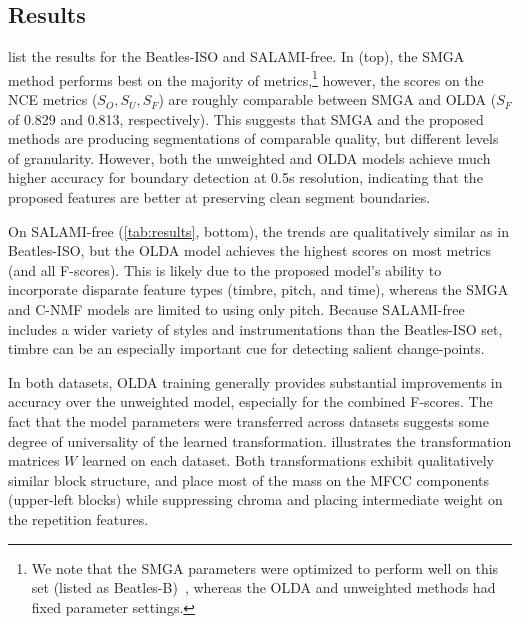\documentclass{article}
\begin{document}
\subsection{Results}
\label{sec:results}
 list the results for the Beatles-ISO and SALAMI-free.
In  (top), the SMGA method performs best on the majority of metrics,\footnote{We
note that the SMGA parameters were optimized to perform well on this set (listed as
Beatles-B)~\cite{serra2012unsupervised}, whereas the OLDA and unweighted methods had fixed parameter settings.}
however, the scores on the NCE metrics ($S_O, S_U, S_F$) are roughly comparable between SMGA and OLDA ($S_F$ of 0.829
and 0.813, respectively). 
This suggests that SMGA and the proposed methods are producing segmentations of comparable quality, but 
different levels of granularity.
However, both the unweighted and OLDA models achieve much higher accuracy for boundary detection at 0.5s resolution,
indicating that the proposed features are better at preserving clean segment boundaries.  

On SALAMI-free (\cref{tab:results}, bottom), the trends are qualitatively similar as in Beatles-ISO, but the OLDA
model achieves the highest scores on most metrics (and all F-scores). This is likely due to the proposed model's
ability to incorporate disparate feature types (timbre, pitch, and time), whereas the SMGA and C-NMF models are
limited to using only pitch. 
Because SALAMI-free includes a wider variety of styles and instrumentations than the Beatles-ISO set, 
timbre can be an especially important cue for detecting salient change-points.

In both datasets, OLDA training generally provides substantial improvements in accuracy over the unweighted model, 
especially for the combined F-scores.
The fact that the model parameters were transferred across datasets suggests some degree of universality of the
learned transformation.   illustrates the transformation matrices $W$ learned on each dataset. Both
transformations exhibit qualitatively similar block structure, and place most of the mass on the MFCC components
(upper-left blocks) while suppressing chroma and placing intermediate weight on the repetition
features.
\end{document}
